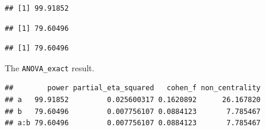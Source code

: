 \documentclass[]{book}
\newenvironment{Shaded}{\begin{snugshade}}{\end{snugshade}}
\newcommand{\DataTypeTok}[1]{\textcolor[rgb]{0.13,0.29,0.53}{#1}}
\newcommand{\KeywordTok}[1]{\textcolor[rgb]{0.13,0.29,0.53}{\textbf{#1}}}
\newcommand{\NormalTok}[1]{#1}
\newcommand{\OperatorTok}[1]{\textcolor[rgb]{0.81,0.36,0.00}{\textbf{#1}}}
\newcommand{\OtherTok}[1]{\textcolor[rgb]{0.56,0.35,0.01}{#1}}
\newcommand{\StringTok}[1]{\textcolor[rgb]{0.31,0.60,0.02}{#1}}
\begin{document}
\begin{Shaded}
\end{Shaded}

\begin{verbatim}
## [1] 99.91852
\end{verbatim}

\begin{Shaded}
\end{Shaded}

\begin{verbatim}
## [1] 79.60496
\end{verbatim}

\begin{Shaded}
\end{Shaded}

\begin{verbatim}
## [1] 79.60496
\end{verbatim}

The \texttt{ANOVA\_exact} result.

\begin{Shaded}
\end{Shaded}

\begin{verbatim}
##        power partial_eta_squared   cohen_f non_centrality
## a   99.91852         0.025600317 0.1620892      26.167820
## b   79.60496         0.007756107 0.0884123       7.785467
## a:b 79.60496         0.007756107 0.0884123       7.785467
\end{verbatim}
\end{document}
